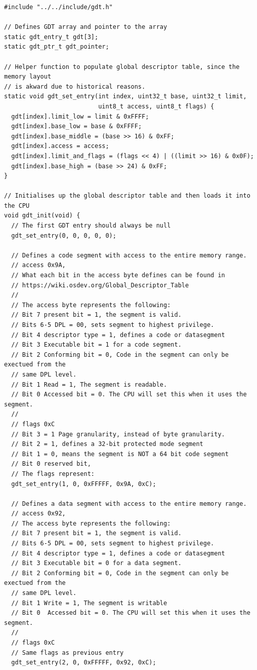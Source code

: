 \documentclass[../main.tex]{subfiles}
\begin{document}
\label{lst:gdt_c}
\begin{verbatim}
#include "../../include/gdt.h"

// Defines GDT array and pointer to the array
static gdt_entry_t gdt[3];
static gdt_ptr_t gdt_pointer;

// Helper function to populate global descriptor table, since the memory layout
// is akward due to historical reasons.
static void gdt_set_entry(int index, uint32_t base, uint32_t limit,
                          uint8_t access, uint8_t flags) {
  gdt[index].limit_low = limit & 0xFFFF;
  gdt[index].base_low = base & 0xFFFF;
  gdt[index].base_middle = (base >> 16) & 0xFF;
  gdt[index].access = access;
  gdt[index].limit_and_flags = (flags << 4) | ((limit >> 16) & 0x0F);
  gdt[index].base_high = (base >> 24) & 0xFF;
}

// Initialises up the global descriptor table and then loads it into the CPU
void gdt_init(void) {
  // The first GDT entry should always be null
  gdt_set_entry(0, 0, 0, 0, 0);

  // Defines a code segment with access to the entire memory range.
  // access 0x9A,
  // What each bit in the access byte defines can be found in
  // https://wiki.osdev.org/Global_Descriptor_Table
  //
  // The access byte represents the following:
  // Bit 7 present bit = 1, the segment is valid.
  // Bits 6-5 DPL = 00, sets segment to highest privilege.
  // Bit 4 descriptor type = 1, defines a code or datasegment
  // Bit 3 Executable bit = 1 for a code segment.
  // Bit 2 Conforming bit = 0, Code in the segment can only be exectued from the
  // same DPL level.
  // Bit 1 Read = 1, The segment is readable.
  // Bit 0 Accessed bit = 0. The CPU will set this when it uses the segment.
  //
  // flags 0xC
  // Bit 3 = 1 Page granularity, instead of byte granularity.
  // Bit 2 = 1, defines a 32-bit protected mode segment
  // Bit 1 = 0, means the segment is NOT a 64 bit code segment
  // Bit 0 reserved bit,
  // The flags represent:
  gdt_set_entry(1, 0, 0xFFFFF, 0x9A, 0xC);

  // Defines a data segment with access to the entire memory range.
  // access 0x92,
  // The access byte represents the following:
  // Bit 7 present bit = 1, the segment is valid.
  // Bits 6-5 DPL = 00, sets segment to highest privilege.
  // Bit 4 descriptor type = 1, defines a code or datasegment
  // Bit 3 Executable bit = 0 for a data segment.
  // Bit 2 Conforming bit = 0, Code in the segment can only be exectued from the
  // same DPL level.
  // Bit 1 Write = 1, The segment is writable
  // Bit 0  Accessed bit = 0. The CPU will set this when it uses the segment.
  //
  // flags 0xC
  // Same flags as previous entry
  gdt_set_entry(2, 0, 0xFFFFF, 0x92, 0xC);


\end{verbatim}
\end{document}
